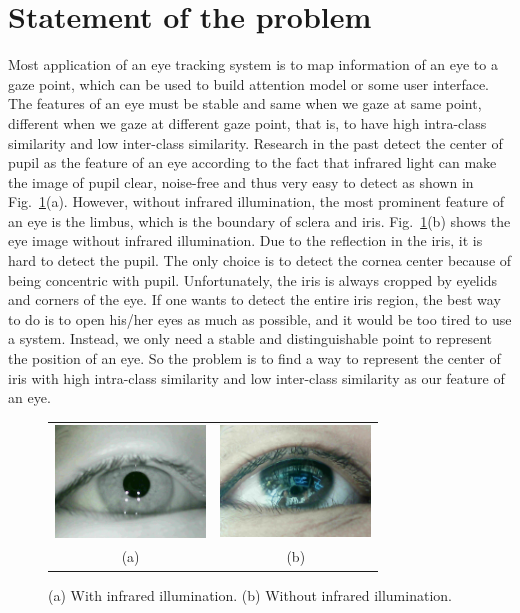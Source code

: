 \documentclass[sigconf]{acmart}
\begin{document}
\section{Statement of the problem}
Most application of an eye tracking system is to map information of an eye to a gaze point, which can be used to build attention model or some user interface. The features of an eye must be stable and same when we gaze at same point, different when we gaze at different gaze point, that is, to have high intra-class similarity and low inter-class similarity. Research in the past detect the center of pupil as the feature of an eye according to the fact that infrared light can make the image of pupil clear, noise-free and thus very easy to detect\cite{5068882}\cite{Morimoto2000331} as shown in Fig.~\ref{fig:infrared}(a). However, without infrared illumination, the most prominent feature of an eye is the limbus, which is the boundary of sclera and iris. Fig.~\ref{fig:infrared}(b) shows the eye image without infrared illumination. Due to the reflection in the iris, it is hard to detect the pupil. The only choice is to detect the cornea center because of being concentric with pupil. Unfortunately, the iris is always cropped by eyelids and corners of the eye. If one wants to detect the entire iris region, the best way to do is to open his/her eyes as much as possible, and it would be too tired to use a system. Instead, we only need a stable and distinguishable point to represent the position of an eye. So the problem is to find a way to represent the center of iris with high intra-class similarity and low inter-class similarity as our feature of an eye.

\begin{figure}
\centering
\begin{tabular}{cc}
\includegraphics[width=4cm]{../Fig/infrared_spectrum.png} &
\includegraphics[width=4cm]{../Fig/visible_spectrum.png} \\
(a) & (b)
\end{tabular}
\caption{(a) With infrared illumination. (b) Without infrared illumination.}
\label{fig:infrared}
\end{figure}
\end{document}
